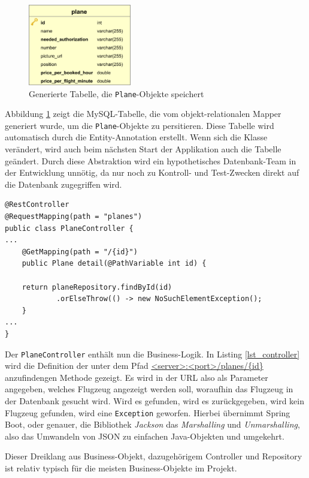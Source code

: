\documentclass[a4paper, 11pt]{article}
\begin{document}
\begin{figure}[htpb]
    \centering
    \includegraphics[width=0.4\textwidth]{images/erm/plane.png}
    \caption{Generierte Tabelle, die \texttt{Plane}-Objekte speichert}
    \label{fig:plane_table}
\end{figure}

Abbildung \ref{fig:plane_table} zeigt die MySQL-Tabelle, die vom
objekt-relationalen Mapper generiert wurde, um die \texttt{Plane}-Objekte zu
persitieren. Diese Tabelle wird automatisch durch die Entity-Annotation
erstellt. Wenn sich die Klasse verändert, wird auch beim nächsten Start der
Applikation auch die Tabelle geändert. Durch diese Abstraktion wird ein
hypothetisches Datenbank-Team in der Entwicklung unnötig, da nur noch zu
Kontroll- und Test-Zwecken direkt auf die Datenbank zugegriffen wird.


\begin{lstlisting}[caption=Ausschnitt eines REST-Controllers, label=lst_controller, float]
@RestController
@RequestMapping(path = "planes")
public class PlaneController {
...
    @GetMapping(path = "/{id}")
    public Plane detail(@PathVariable int id) {

    return planeRepository.findById(id)
            .orElseThrow(() -> new NoSuchElementException();
    }
...
}
\end{lstlisting}


Der \texttt{PlaneController} enthält nun die Business-Logik.  In Listing
\ref{lst_controller} wird die Definition der unter dem Pfad
\url{<server>:<port>/planes/{id}} anzufindengen Methode gezeigt. Es wird in der
URL also als Parameter angegeben, welches Flugzeug angezeigt werden soll, woraufhin
das Flugzeug in der Datenbank gesucht wird. Wird es gefunden, wird es
zurückgegeben, wird kein Flugzeug gefunden, wird eine \lstinline{Exception}
geworfen. Hierbei übernimmt Spring Boot, oder genauer, die Bibliothek \emph{Jackson}
das \emph{Marshalling} und \emph{Unmarshalling}, also das Umwandeln von JSON zu
einfachen Java-Objekten und umgekehrt. 

Dieser Dreiklang aus Business-Objekt, dazugehörigem Controller und Repository
ist relativ typisch für die meisten Business-Objekte im Projekt.
\end{document}
